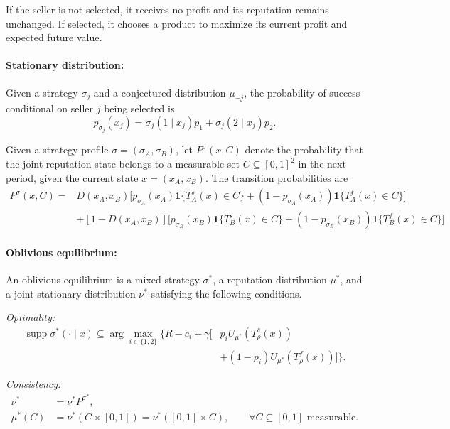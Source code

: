 \documentclass[11pt]{article}
\begin{document}
If the seller is not selected, it receives no profit and its reputation remains unchanged. If selected, it chooses a product to maximize its current profit and expected future value.

\paragraph{Stationary distribution:}
Given a strategy $\sigma_j$ and a conjectured distribution
$\mu_{-j}$, the probability of success conditional on
seller $j$ being selected is
\begin{equation}
p_{\sigma_j}(x_j) = \sigma_j(1\mid x_j)p_1 + \sigma_j(2\mid x_j)p_2.
\end{equation}

Given a strategy profile $\sigma=(\sigma_A,\sigma_B)$,
let $P^\sigma(x,C)$ denote the probability that the
joint reputation state belongs to a measurable set
$C\subseteq[0,1]^2$ in the next period, given the
current state $x=(x_A,x_B)$. The transition probabilities are
\begin{equation}
\begin{aligned}
P^\sigma(x,C)
={}&D(x_A,x_B)
\Big[
p_{\sigma_A}(x_A)\mathbf{1}\{T_A^s(x)\in C\} + (1-p_{\sigma_A}(x_A))
\mathbf{1}\{T_A^f(x)\in C\}\Big]\\
&+[1-D(x_A,x_B)]\Big[p_{\sigma_B}(x_B)\mathbf{1}\{T_B^s(x)\in C\}+(1-p_{\sigma_B}(x_B))\mathbf{1}\{T_B^f(x)\in C\}
\Big]
\end{aligned}
\end{equation}

\paragraph{Oblivious equilibrium:}
An oblivious equilibrium is a mixed strategy $\sigma^*$,
a reputation distribution $\mu^*$, and a joint stationary
distribution $\nu^*$ satisfying the following conditions.

\textit{Optimality:}
\begin{equation}
\begin{aligned}
\operatorname{supp}\sigma^*(\cdot\mid x)
\subseteq
\arg\max_{i\in\{1,2\}}
\Big\{
R-c_i
+\gamma\big[
&p_iU_{\mu^*}(T_\rho^s(x))\\
&+(1-p_i)U_{\mu^*}(T_\rho^f(x))
\big]
\Big\}.
\end{aligned}
\end{equation}

\textit{Consistency:}
\begin{equation}
\begin{aligned}
\nu^*&=\nu^*P^{\sigma^*},\\
\mu^*(C)&=\nu^*(C\times[0,1])
=\nu^*([0,1]\times C),
\qquad \forall C\subseteq[0,1]
\text{ measurable}.
\end{aligned}
\end{equation}
\end{document}
